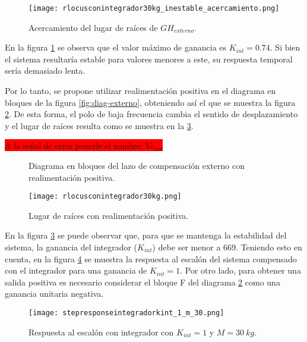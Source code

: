 \begin{figure}[H]
	\centering
	\texttt{[image: rlocusconintegrador30kg\_inestable\_acercamiento.png]}
	\caption{Acercamiento del lugar de raíces de $GH_{externo}$.}
	\label{fig:lugar-de-raices-con-integrador-analog_inestable_acercamiento}
\end{figure}

En la figura \ref{fig:lugar-de-raices-con-integrador-analog_inestable_acercamiento} se observa que el valor máximo de ganancia es $K_{int}=0.74$. Si bien el sistema resultaría estable para valores menores a este, su respuesta temporal sería demasiado lenta. 

Por lo tanto, se propone utilizar realimentación positiva en el diagrama en bloques de la figura \ref{fig:diag-externo}, obteniendo así el que se muestra la figura \ref{fig:diag-externo_real_positiva}. De esta forma, el polo de baja frecuencia cambia el sentido de desplazamiento y el lugar de raíces resulta como se muestra en la \ref{fig:lugar-de-raices-con-integrador-analog}.

\colorbox{red}{A la señal de error ponerle el nombre: $Ve_{ext}$}

\begin{figure}[H]
	\centering
	
	\caption{Diagrama en bloques del lazo de compensación externo con realimentación positiva.}	
	\label{fig:diag-externo_real_positiva}
\end{figure}


\begin{figure}[H]
	\centering
	\texttt{[image: rlocusconintegrador30kg.png]}
	\caption{Lugar de raíces con realimentación positiva.}
	\label{fig:lugar-de-raices-con-integrador-analog}
\end{figure}
 
\noindent En la figura \ref{fig:lugar-de-raices-con-integrador-analog} se puede observar que, para que se mantenga la estabilidad del sistema, la ganancia del integrador ($K_{int}$) debe ser menor a 669. Teniendo esto en cuenta, en la figura \ref{fig:respuesta-al-escalon-con-k-1-M-30-analog} se muestra la respuesta al escalón del sistema compensado con el integrador para una ganancia de $K_{int}=1$. Por otro lado, para obtener una salida positiva es necesario considerar el bloque F del diagrama \ref{fig:diag-externo_real_positiva} como una ganancia unitaria negativa.

\begin{figure}[H]
	\centering
	\texttt{[image: stepresponseintegradorkint\_1\_m\_30.png]}
	\caption{Respuesta al escalón con integrador con $K_{int} =1$ y $M=30\:kg$.}
	\label{fig:respuesta-al-escalon-con-k-1-M-30-analog}
\end{figure}

